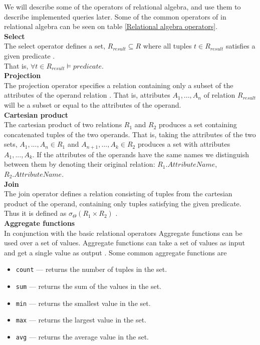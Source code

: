 We will describe some of the operators of relational algebra, and use them to describe implemented queries later.
Some of the common operators of in relational algebra can be seen on table \ref{Relational algebra operators}.\\
\textbf{Select}\\
The select operator defines a set, $R_{result}\subseteq R$ where all tuples $t \in R_{result}$ satisfies a given predicate \cite{DBSBook}.\\
That is, $\forall t \in R_{result} \vDash predicate$.\\
\textbf{Projection}\\
The projection operator specifies a relation containing only a subset of the attributes of the operand relation \cite{DBSBook}.
That is, attributes $A_1, ..., A_n$ of relation $R_{result}$ will be a subset or equal to the attributes of the operand.\\
\textbf{Cartesian product}\\
The cartesian product of two relations $R_1$ and $R_2$ produces a set containing concatenated tuples of the two operands.
That is, taking the attributes of the two sets, $A_1,...,A_n \in R_1$ and $A_{n+1},...,A_k \in R_2$ produces a set with attributes $A_1,...,A_k$.
If the attributes of the operands have the same names we distinguish between them  by denoting their original relation: $R_1.AttributeName$, $R_2.AttributeName$. \cite{DBSBook}\\   
\textbf{Join}\\
The join operator defines a relation consisting of tuples from the cartesian product of the operand, containing only tuples satisfying the given predicate.
Thus it is defined as $\sigma_{\Theta} (R_1 \times R_2)$ \cite{DBSBook}.\\
\textbf{Aggregate functions}\\
In conjunction with the basic relational operators Aggregate functions can be used over a set of values.
Aggregate functions can take a set of values as input and get a single value as output \cite{DBSBook}. Some common aggregate functions are 
\begin{itemize} \label{aggregateFunctions}
    \item \texttt{count} --- returns the number of tuples in the set.
    \item \texttt{sum} --- returns the sum of the values in the set.
    \item \texttt{min} --- returns the smallest value in the set.
    \item \texttt{max} --- returns the largest value in the set.
    \item \texttt{avg} --- returns the average value in the set.
\end{itemize}


